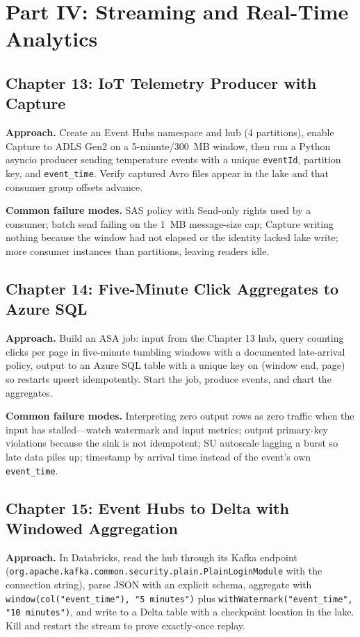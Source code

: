 \section{Part IV: Streaming and Real-Time Analytics}

\subsection*{Chapter 13: IoT Telemetry Producer with Capture}
\textbf{Approach.} Create an Event Hubs namespace and hub (4 partitions), enable Capture to ADLS
Gen2 on a 5-minute/300~MB window, then run a Python asyncio producer sending temperature events
with a unique \texttt{eventId}, partition key, and \texttt{event\_time}. Verify captured Avro
files appear in the lake and that consumer group offsets advance.

\textbf{Common failure modes.} SAS policy with Send-only rights used by a consumer; batch send
failing on the 1~MB message-size cap; Capture writing nothing because the window had not elapsed
or the identity lacked lake write; more consumer instances than partitions, leaving readers idle.

\subsection*{Chapter 14: Five-Minute Click Aggregates to Azure SQL}
\textbf{Approach.} Build an ASA job: input from the Chapter 13 hub, query counting clicks per
page in five-minute tumbling windows with a documented late-arrival policy, output to an Azure
SQL table with a unique key on (window end, page) so restarts upsert idempotently. Start the job,
produce events, and chart the aggregates.

\textbf{Common failure modes.} Interpreting zero output rows as zero traffic when the input has
stalled---watch watermark and input metrics; output primary-key violations because the sink is
not idempotent; SU autoscale lagging a burst so late data piles up; timestamp by arrival time
instead of the event's own \texttt{event\_time}.

\subsection*{Chapter 15: Event Hubs to Delta with Windowed Aggregation}
\textbf{Approach.} In Databricks, read the hub through its Kafka endpoint
(\texttt{org.apache.kafka.common.security.plain.PlainLoginModule} with the connection string),
parse JSON with an explicit schema, aggregate with \texttt{window(col("event\_time"), "5 minutes")}
plus \texttt{withWatermark("event\_time", "10 minutes")}, and write to a Delta table with a
checkpoint location in the lake. Kill and restart the stream to prove exactly-once replay.

